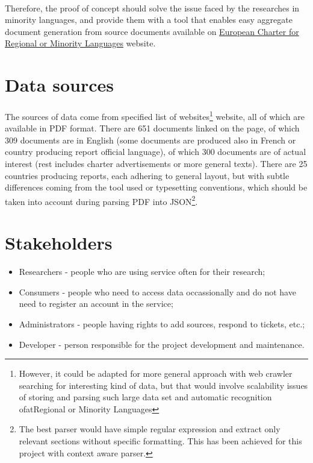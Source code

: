\documentclass[11pt, a4paper]{report}
\begin{document}
\paragraph{}
Therefore, the proof of concept should solve the issue faced by the researches in minority languages, and provide them with a tool that enables easy aggregate document generation from source documents available on \href{http://www.coe.int/t/dg4/education/minlang/Report/default_en.asp}{European Charter for Regional or Minority Languages} website.

\section{Data sources}
\paragraph{}
The sources of data come from specified list of websites\footnote{However, it could be adapted for more general approach with web crawler searching for interesting kind of data, but that would involve scalability issues of storing and parsing such large data set and automatic recognition ofatRegional or Minority Languages} website, all of which are available in PDF format. There are 651 documents linked on the page, of which 309 documents are in English (some documents are produced also in French or country producing report official language), of which 300 documents are of actual interest (rest includes charter advertisements or more general texts). There are 25 countries producing reports, each adhering to general layout, but with subtle differences coming from the tool used or typesetting conventions, which should be taken into account during parsing PDF into JSON\footnote{The best parser would have simple regular expression and extract only relevant sections without specific formatting. This has been achieved for this project with context aware parser.}.

\section{Stakeholders}

\begin{itemize}
  \item Researchers - people who are using service often for their research;
  \item Consumers - people who need to access data occassionally and do not have need to register an account in the service;
  \item Administrators - people having rights to add sources, respond to tickets, etc.;
  \item Developer - person responsible for the project development and maintenance.
\end{itemize}
\end{document}
